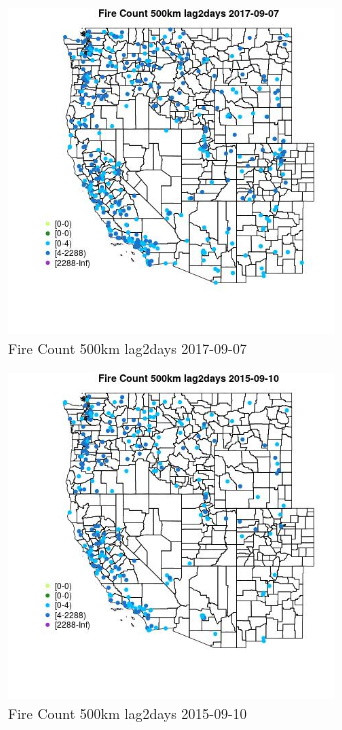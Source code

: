 \begin{figure} 
\centering  
\includegraphics[width=0.77\textwidth]{Code_Outputs/Report_ML_input_PM25_Step4_part_e_de_duplicated_aves_compiled_2019-05-20wNAs_MapObsFire_Count_500km_lag2days2017-09-07.jpg} 
\caption{\label{fig:Report_ML_input_PM25_Step4_part_e_de_duplicated_aves_compiled_2019-05-20wNAsMapObsFire_Count_500km_lag2days2017-09-07}Fire Count 500km lag2days 2017-09-07} 
\end{figure} 
 

\begin{figure} 
\centering  
\includegraphics[width=0.77\textwidth]{Code_Outputs/Report_ML_input_PM25_Step4_part_e_de_duplicated_aves_compiled_2019-05-20wNAs_MapObsFire_Count_500km_lag2days2015-09-10.jpg} 
\caption{\label{fig:Report_ML_input_PM25_Step4_part_e_de_duplicated_aves_compiled_2019-05-20wNAsMapObsFire_Count_500km_lag2days2015-09-10}Fire Count 500km lag2days 2015-09-10} 
\end{figure} 
 

